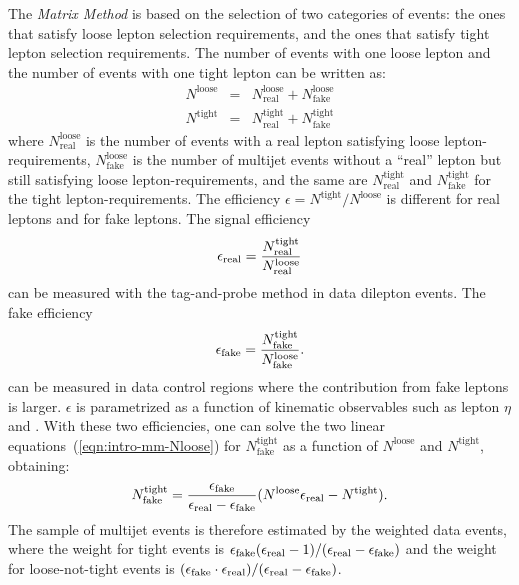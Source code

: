 The {\it Matrix Method} is based on the selection of two categories of
events: the ones that satisfy loose lepton selection requirements, and
the ones that satisfy tight lepton selection requirements.
The number of events with one loose lepton and
the number of events with one tight lepton can be written as:
%                                                                                             
\begin{eqnarray}
  N^\mathrm{loose}
  & = & N^\mathrm{loose}_\mathrm{real}
  + N^{\mathrm{loose}}_\mathrm{fake} \nonumber \\
  N^\mathrm{tight}
  & = & N^\mathrm{tight}_\mathrm{real}
  + N^{\mathrm{tight}}_\mathrm{fake}
  \label{eqn:intro-mm-Nloose}
\end{eqnarray}
%                                                                                             
where $N^\mathrm{loose}_\mathrm{real}$ is the number of events with a
real lepton satisfying loose lepton-requirements,
$N^\mathrm{loose}_\mathrm{fake}$ is the number of multijet events
without a ``real'' lepton but still satisfying loose
lepton-requirements, and the same are $N^\mathrm{tight}_\mathrm{real}$
and $N^\mathrm{tight}_\mathrm{fake}$ for the tight
lepton-requirements. The efficiency
$\epsilon=N^\mathrm{tight}/N^\mathrm{loose}$ is different for real
leptons and for fake leptons. The signal efficiency
%                                                                                             
\begin{equation}
  \epsilon_{\mathrm{real}}{}
  = \frac{N^\mathrm{tight}_\mathrm{real}}{N^\mathrm{loose}_\mathrm{real}}
\end{equation}
can be measured with the tag-and-probe method in data dilepton events.
The fake efficiency
\begin{equation}
  \epsilon_{\mathrm{fake}}{}
  = \frac{N^\mathrm{tight}_\mathrm{fake}}{N^\mathrm{loose}_\mathrm{fake}}.
  \label{eqn:intro-mm-real-fake}
\end{equation}
can be measured in data control regions where the contribution from
fake leptons is larger. $\epsilon$ is parametrized as a
function of kinematic observables such as lepton $\eta$ and . With these
two efficiencies, one can solve the two linear
equations~(\ref{eqn:intro-mm-Nloose}) for
$N^{\mathrm{tight}}_\mathrm{fake}$ as a function of $N^\mathrm{loose}$
and $N^\mathrm{tight}$, obtaining:
%                                                                                             
\begin{equation}
  N^\mathrm{tight}_\mathrm{fake}
  = \frac{\epsilon_{\mathrm{fake}}{}}
  {\epsilon_{\mathrm{real}}{} - \epsilon_{\mathrm{fake}}{}}
  (N^\mathrm{loose} \epsilon_{\mathrm{real}}{} - N^\mathrm{tight}).
  \label{eqn:intro-mm-tight_fake}
\end{equation}
%                                                                                             
The sample of multijet events is therefore estimated by the weighted
data events, where the weight for tight events is
$\epsilon_{\mathrm{fake}}{}(\epsilon_{\mathrm{real}}{}-1)/(\epsilon_{\mathrm{real}}{}-\epsilon_{\mathrm{fake}}{})$
and the weight for loose-not-tight events is
$(\epsilon_{\mathrm{fake}}{}\cdot{}\epsilon_{\mathrm{real}}{})/(\epsilon_{\mathrm{real}}{}-\epsilon_{\mathrm{fake}}{})$.

